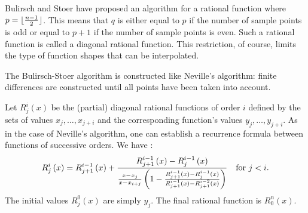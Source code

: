 Bulirsch and Stoer have proposed an algorithm for a rational
function where $p=\lfloor{n-1 \over 2}\rfloor$. This means that
$q$ is either equal to $p$ if the number of sample points is odd
or equal to $p+1$ if the number of sample points is even. Such a
rational function is called a diagonal rational function. This
restriction, of course, limits the type of function shapes that
can be interpolated.

The Bulirsch-Stoer algorithm is constructed like Neville's
algorithm: finite differences are constructed until all points
have been taken into account.

Let $R_j^i\left(x\right)$ be the (partial) diagonal rational
functions of order $i$ defined by the sets of values
$x_j,\ldots,x_{j+i}$ and the corresponding function's values
$y_j,\ldots,y_{j+i}$. As in the case of Neville's algorithm, one
can establish a recurrence formula between functions of successive
orders. We have \cite{Press}:
\begin{equation}
\label{eq:bustoer}
R_j^i\left(x\right)=R_{j+1}^{i-1}\left(x\right)+
{R_{j+1}^{i-1}\left(x\right) - R_j^{i-1}\left(x\right) \over
{x-x_j\over x-x_{i+j}}\left(1-{R_{j+1}^{i-1}\left(x\right)
-R_j^{i-1}\left(x\right)\over R_{j+1}^{i-1}\left(x\right)
-R_{j+1}^{i-2}\left(x\right)}\right)}\mbox{\quad for $j<i$}.
\end{equation}
The initial values $R_j^0\left(x\right)$ are simply $y_j$. The
final rational function is $R_0^n\left(x\right)$.

